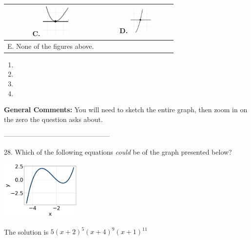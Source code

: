 \documentclass{extbook}[14pt]
\begin{document}
\begin{tabular}{|c|c|}
 \textbf{C.} \includegraphics[width=0.3\textwidth]{../Figures/polyZeroBehaviorCC.png} & \textbf{D.} \includegraphics[width=0.3\textwidth]{../Figures/polyZeroBehaviorDC.png} \tabularnewline 
\hline 
 E. None of the figures above. & \tabularnewline 
\hline 
 \end{tabular} 
 
\begin{enumerate}[label=\Alph*.] 
\item   
\item   
\item   
\item   
\end{enumerate} 
 
\textbf{General Comments:} You will need to sketch the entire graph, then zoom in on the zero the question asks about.

-----------------------------------------------

28. Which of the following equations \textit{could} be of the graph presented below?
\begin{center} \includegraphics[width=0.3\textwidth]{../Figures/polyGraphToFunctionC.png} \end{center} 

The solution is $ 5(x + 2)^{5} (x + 4)^{9} (x + 1)^{11} $ 
\end{document}
